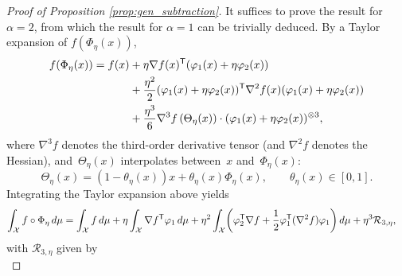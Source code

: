 \begin{proof}[Proof of Proposition \ref{prop:gen_subtraction}]
It suffices to prove the result for $\alpha=2$, from which the result for $\alpha=1$ can be trivially deduced. By a Taylor expansion of $f(\Phi_\eta(x))$,
%
\begin{align}
		f(\Phi_\eta(x)) = f(x) &+ \eta \nabla f(x)^\mathsf T(\varphi_1(x) + \eta\varphi_2(x)) \\
		&+ \frac{\eta^2}{2}(\varphi_1(x) + \eta\varphi_2(x))^\mathsf T \nabla^2 f(x)(\varphi_1(x) + \eta\varphi_2(x)) \\
		&+ \frac{\eta^3}{6} \nabla^3f\left(\Theta_\eta(x)\right)\cdot (\varphi_1(x) + \eta\varphi_2(x))^{\otimes 3},
\end{align}
%
where $\nabla^3 f$ %
denotes the third-order derivative tensor (and $\nabla^2 f$ denotes the Hessian), and~$\Theta_\eta(x)$ interpolates between~$x$ and~$\Phi_\eta(x)$:
%
\begin{equation}
	\Theta_\eta(x) = (1-\theta_\eta(x))x + \theta_\eta(x)\Phi_\eta(x), \qquad \theta_\eta(x) \in [0,1].
\end{equation}
%
Integrating the Taylor expansion above yields
%
\begin{align}
	\int_\mathcal{X} f\circ\Phi_\eta \, d\mu &= \int_\mathcal{X} f \, d\mu + \eta \int_\mathcal{X}\nabla f^\t \varphi_1 \, d\mu + \eta^2\int_\mathcal{X} \paren*{\varphi_2^\t \nabla f+\frac{1}{2}\varphi_1^\t(\nabla^2 f)\varphi_1} \, d\mu + \eta^3\mathcal{R}_{3,\eta},
	\label{eq:prop_rhs_terms}
\end{align}
%
with $\mathcal{R}_{3,\eta}$ given by %
%
\begin{equation}

\end{equation}
\end{proof}
